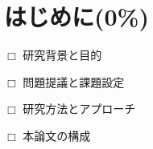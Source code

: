 \section{はじめに(0\%)}
  \label{sec:はじめに}
    \par $\Box$ 研究背景と目的
    \par $\Box$ 問題提議と課題設定
    \par $\Box$ 研究方法とアプローチ
    \par $\Box$ 本論文の構成
